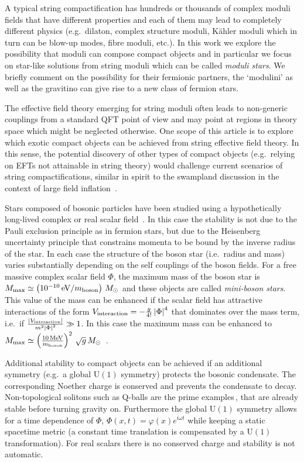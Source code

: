 \documentclass[11pt,a4paper]{article}
\begin{document}
A typical string compactification has hundreds or thousands of complex moduli fields that have different properties and each of them may lead to completely different physics (e.g.~dilaton, complex structure moduli, K\"ahler moduli which in turn can be blow-up modes, fibre moduli, etc.). In this work we explore the possibility that moduli can compose compact objects and in particular we focus on star-like solutions from string moduli which can be called \textit{moduli stars}. We briefly comment on the possibility for their fermionic partners, the `modulini' as well as the gravitino can give rise to a new class of fermion stars.

The effective field theory emerging for string moduli often leads to non-generic couplings from a standard QFT point of view and may point at regions in theory space which might be neglected otherwise. One scope of this article is to explore which exotic compact objects can be achieved from string effective field theory. In this sense, the potential discovery of other types of compact objects (e.g.~relying on EFTs not attainable in string theory) would challenge current scenarios of string compactifications, similar in spirit to the swampland discussion in the context of large field inflation~\cite{Vafa:2005ui}.

Stars composed of bosonic particles have been studied using a hypothetically long-lived complex or real scalar field~\cite{Kaup:1968zz, Ruffini:1969qy}. In this case the stability is not due to the Pauli exclusion principle as in fermion stars, but due to the Heisenberg uncertainty principle that constrains momenta to be bound by the inverse radius of the star. In each case the structure of the boson star (i.e.~radius and mass) varies substantially depending on the self couplings of the boson fields. For a free massive complex scalar field $\Phi$, the maximum mass of the boson star is $M_{\rm max}\simeq\left(10^{-10}\,{\rm eV}/m_{\rm boson}\right) \, M_{\odot}$ and these objects are called \textit{mini-boson stars}. This value of the mass can be enhanced if the scalar field has attractive interactions of the form $V_{\rm interaction} = - \frac{g}{4!} \left|\Phi\right|^4$ that dominates over the mass term, i.e.~if $\frac{\left|V_{\rm interaction}\right|}{m^2 \left|\Phi\right|^2} \gg 1$. In this case the maximum mass can be enhanced to $M_{\rm max} \simeq \left(\frac{10 \, \text{MeV}}{m_{\rm boson}}\right)^2 \, \sqrt{g} \, M_{\odot}$~\cite{Colpi:1986ye}.
 
Additional stability to compact objects can be achieved if an additional symmetry (e.g.~a global U$(1)$ symmetry) protects the bosonic condensate. The corresponding Noether charge is conserved and prevents the condensate to decay. Non-topological solitons such as Q-balls are the prime examples\,\cite{Coleman:1985ki}, that are already stable before turning gravity on. Furthermore the global U$(1)$ symmetry allows for a time dependence of $\Phi$, $\Phi(x,t)=\varphi(x) e^{i\omega t}$ while keeping a static spacetime metric (a constant time translation is compensated by a U$(1)$ transformation). For real scalars there is no conserved charge and stability is not automatic. 
\end{document}
